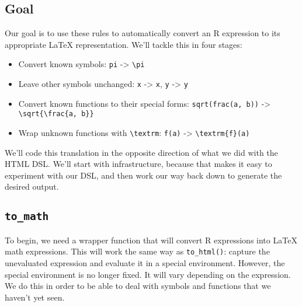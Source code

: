 \subsection{Goal}

Our goal is to use these rules to automatically convert an R expression
to its appropriate LaTeX representation. We'll tackle this in four
stages:

\begin{itemize}
\item
  Convert known symbols: \texttt{pi} -\textgreater{}
  \texttt{\textbackslash{}pi}
\item
  Leave other symbols unchanged: \texttt{x} -\textgreater{} \texttt{x},
  \texttt{y} -\textgreater{} \texttt{y}
\item
  Convert known functions to their special forms:
  \texttt{sqrt(frac(a, b))} -\textgreater{}
  \texttt{\textbackslash{}sqrt\{\textbackslash{}frac\{a, b\}\}}
\item
  Wrap unknown functions with \texttt{\textbackslash{}textrm}:
  \texttt{f(a)} -\textgreater{} \texttt{\textbackslash{}textrm\{f\}(a)}
\end{itemize}

We'll code this translation in the opposite direction of what we did
with the HTML DSL. We'll start with infrastructure, because that makes
it easy to experiment with our DSL, and then work our way back down to
generate the desired output.

\subsection{\texttt{to\_math}}

To begin, we need a wrapper function that will convert R expressions
into LaTeX math expressions. This will work the same way as
\texttt{to\_html()}: capture the unevaluated expression and evaluate it
in a special environment. However, the special environment is no longer
fixed. It will vary depending on the expression. We do this in order to
be able to deal with symbols and functions that we haven't yet seen.

\begin{Shaded}
\begin{Highlighting}[]
\StringTok{ }
  \StringTok{ }
\NormalTok{\}}
\end{Highlighting}
\end{Shaded}

